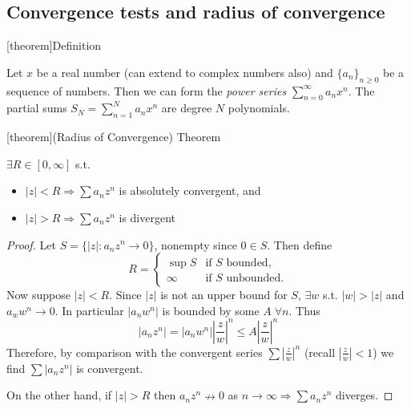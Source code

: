 \documentclass[12pt]{report}
\theoremstyle{definition}
\begin{document}
\subsection{Convergence tests and radius of convergence}
[theorem]{Definition}
\begin{power series}    
    Let $x$ be a real number (can extend to complex numbers also) and ${\{a_{n}\}}_{n \ge 0}$ be a sequence of numbers.
    Then we can form the \emph{power series} $\sum_{n=0}^{\infty} a_n x^{n}$.
    The partial sums $S_N = \sum_{n=1}^{N} a_n x^{n}$ are degree $N$ polynomials.
\end{power series}
[theorem]{(Radius of Convergence) Theorem}
\begin{radius of convergence}
    $\exists R \in [0,\infty]$ s.t.
    \begin{itemize}
            \item $|z| < R \Rightarrow \sum a_n z^{n}$ is absolutely convergent, and
            \item $|z| > R \Rightarrow \sum a_n z^{n}$ is divergent
    \end{itemize}
\end{radius of convergence}
\begin{proof}
    Let $S = \{|z|: a_n z^{n} \rightarrow 0\}$, nonempty since $0 \in S$. Then define \[
        R = 
        \begin{cases}
            \sup{S} & \text{if $S$ bounded,} \\
            \infty & \text{if $S$ unbounded.}
        \end{cases}
    \]Now suppose $|z| < R$.
    Since $|z|$ is not an upper bound for $S$, $\exists w$ s.t. $|w| > |z|$ and $a_w w^{n} \rightarrow 0$.
    In particular $|a_n w^{n}|$ is bounded by some $A \;\forall n$. Thus \[
        |a_n z^{n}| = |a_n w^{n}|{\left|\frac{z}{w}\right|}^{n} \le A {\left|\frac{z}{w}\right|}^{n}
    \]
    Therefore, by comparison with the convergent series $\sum {\left|\frac{z}{w}\right|}^{n}$ 
    (recall $\left|\frac{z}{w}\right| < 1$)
    we find $\sum |a_n z^{n}|$ is convergent.

    On the other hand, if $|z| > R$ then $a_n z^{n} \nrightarrow 0$ as $n \rightarrow \infty \Rightarrow 
    \sum a_n z^{n}$ diverges.
\end{proof}
\end{document}
